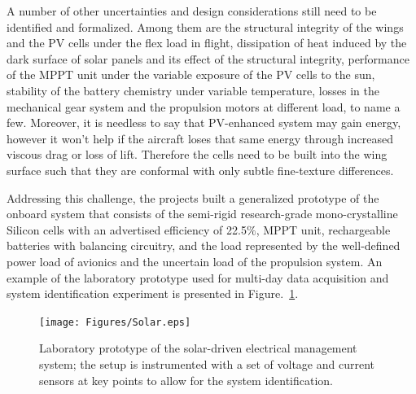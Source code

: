 \documentclass{ifacconf}
\begin{document}
A number of other uncertainties and design considerations still need to be
identified and formalized. Among them are the structural integrity of the
wings and the PV cells under the flex load in flight, dissipation of heat
induced by the dark surface of solar panels and its effect of the structural
integrity,  performance of the MPPT unit under the variable exposure of the
PV cells to the sun, stability of the battery chemistry under variable
temperature, losses in the mechanical gear system and the propulsion motors
at different load, to name a few. Moreover, it is needless to say that
PV-enhanced system may gain energy, however it won't help if the aircraft
loses that same energy through increased viscous drag or loss of lift.
Therefore the cells need to be built into the wing surface such that they are
conformal with only subtle fine-texture differences.
%

Addressing this challenge, the projects built a generalized prototype of the
onboard system that consists of the semi-rigid research-grade
mono-crystalline Silicon cells with an advertised efficiency of 22.5$\%$,
MPPT unit, rechargeable batteries with balancing circuitry, and the load
represented by the well-defined power load of avionics and the uncertain load
of the propulsion system. An example of the laboratory prototype used for
multi-day data acquisition and system identification experiment is presented
in Figure.~\ref{fig:Solar_arch}.

\begin{figure}[thpb]
  \centering
  \texttt{[image: Figures/Solar.eps]}
  \caption{Laboratory prototype of the solar-driven electrical management system; the setup is
  instrumented with a set of voltage and current sensors at key points to allow for the system
  identification.}
  \label{fig:Solar_arch}
\end{figure}
\end{document}
